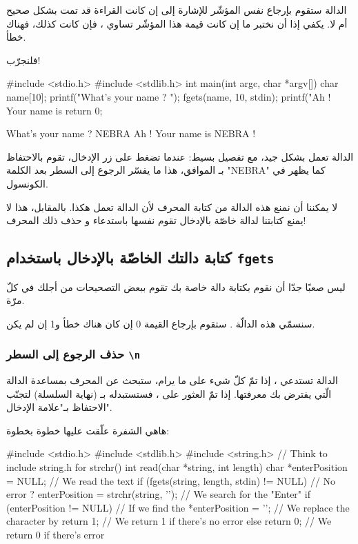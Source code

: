 الدالة ستقوم بإرجاع نفس المؤشّر
للإشارة إلى إن كانت القراءة قد تمت بشكل صحيح أم لا. يكفي إذا أن نختبر ما إن كانت قيمة هذا المؤشّر تساوي
،
فإن كانت كذلك، فهناك خطأ.

فلنجرّب!

\begin{Csource}
#include <stdio.h>
#include <stdlib.h>
int main(int argc, char *argv[])
{
	char name[10];
	printf("What's your name ? ");
	fgets(name, 10, stdin);
	printf("Ah ! Your name is %
	return 0;
}
\end{Csource}

\begin{Console}
What's your name ? NEBRA
Ah ! Your name is NEBRA
!
\end{Console}

الدالة تعمل بشكل جيد، مع تفصيل بسيط: عندما تضغط على زر الإدخال، تقوم
بالاحتفاظ بـ
الموافق، هذا ما يفسّر الرجوع إلى السطر بعد الكلمة
"\textenglish{NEBRA}"
كما يظهر في الكونسول.

لا يمكننا أن نمنع هذه الدالة من كتابة المحرف
لأن الدالة تعمل هكذا. بالمقابل، هذا لا يمنع كتابتنا لدالة خاصّة بالإدخال تقوم نفسها باستدعاء
و حذف ذلك المحرف!

\subsection{كتابة دالتك الخاصّة بالإدخال باستخدام \texttt{fgets}}

ليس صعبًا جدّا أن نقوم بكتابة دالة خاصة بك تقوم ببعض التصحيحات من أجلك في كلّ مرّة.

سنسمّي هذه الدالّة
.
ستقوم بإرجاع القيمة 0 إن كان هناك خطأ و1 إن لم يكن.

\subsubsection{حذف الرجوع إلى السطر \texttt{\textbackslash n}}

الدالة
تستدعي
،
إذا تمّ كلّ شيء على ما يرام، ستبحث عن المحرف
بمساعدة الدالة
الّتي يفترض بك معرفتها. إذا تمّ العثور على
،
فستستبدله بـ
(نهاية السلسلة) لتجنّب الاحتفاظ بـ"علامة الإدخال".

هاهي الشفرة علّقت عليها خطوة بخطوة:

\begin{Csource}
#include <stdio.h>
#include <stdlib.h>
#include <string.h> // Think to include string.h for strchr()
int read(char *string, int length)
{
	char *enterPosition = NULL;
	// We read the text
	if (fgets(string, length, stdin) != NULL)  // No error ?
	{
    		enterPosition = strchr(string, '\n'); // We search for the "Enter"
    		if (enterPosition != NULL) // If we find the \n
    		{
        			*enterPosition = '\0'; // We replace the character by \0
    		}
    		return 1; // We return 1 if there's no error
	}
	else
	 {
    		return 0; // We return 0 if there's error
	 }
}
\end{Csource}

